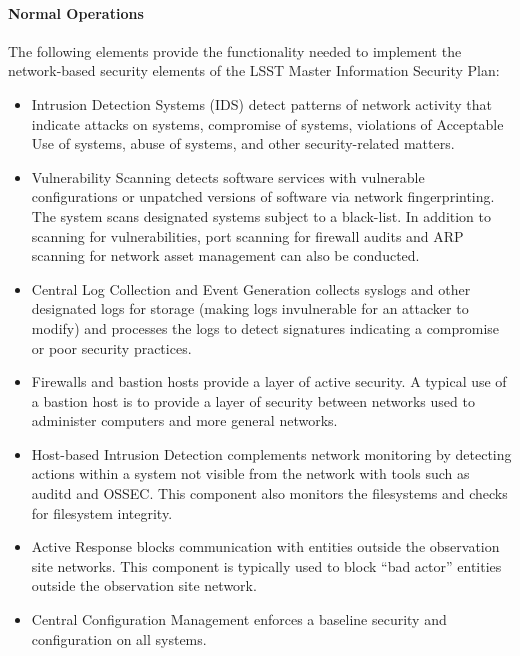 \paragraph{Normal Operations}

The following elements provide the functionality needed to implement the
network-based security elements of the LSST Master Information Security Plan:

\begin{itemize}

\item Intrusion Detection Systems (IDS) detect patterns of network activity that
indicate attacks on systems, compromise of systems, violations of Acceptable Use
of systems, abuse of systems, and other security-related matters.

\item Vulnerability Scanning detects software services with vulnerable
configurations or unpatched versions of software via network fingerprinting. The
system scans designated systems subject to a black-list. In addition to scanning
for vulnerabilities, port scanning for firewall audits and ARP scanning for
network asset management can also be conducted.

\item Central Log Collection and Event Generation collects syslogs and other
designated logs for storage (making logs invulnerable for an attacker to modify)
and processes the logs to detect signatures indicating a compromise or poor
security practices.

\item Firewalls and bastion hosts provide a layer of active security. A typical
use of a bastion host is to provide a layer of security between networks used to
administer computers and more general networks.

\item Host-based Intrusion Detection complements network monitoring by detecting
actions within a system not visible from the network with tools such as auditd
and OSSEC. This component also monitors the filesystems and checks for filesystem
integrity.

\item Active Response blocks communication with entities outside the observation site
networks. This component is typically used to block “bad actor” entities outside
the observation site network.

\item Central Configuration Management enforces a baseline security and configuration
on all systems.

\end{itemize}

